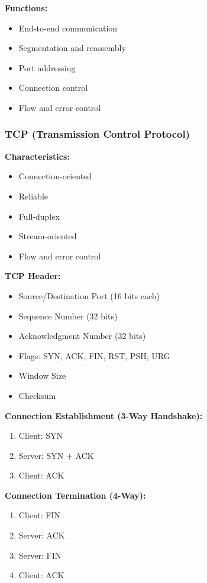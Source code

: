 \documentclass[11pt,a4paper]{article}
\begin{document}
\textbf{Functions:}
\begin{itemize}
    \item End-to-end communication
    \item Segmentation and reassembly
    \item Port addressing
    \item Connection control
    \item Flow and error control
\end{itemize}

\subsubsection{TCP (Transmission Control Protocol)}

\textbf{Characteristics:}
\begin{itemize}
    \item Connection-oriented
    \item Reliable
    \item Full-duplex
    \item Stream-oriented
    \item Flow and error control
\end{itemize}

\textbf{TCP Header:}
\begin{itemize}
    \item Source/Destination Port (16 bits each)
    \item Sequence Number (32 bits)
    \item Acknowledgment Number (32 bits)
    \item Flags: SYN, ACK, FIN, RST, PSH, URG
    \item Window Size
    \item Checksum
\end{itemize}

\textbf{Connection Establishment (3-Way Handshake):}
\begin{enumerate}
    \item Client: SYN
    \item Server: SYN + ACK
    \item Client: ACK
\end{enumerate}

\textbf{Connection Termination (4-Way):}
\begin{enumerate}
    \item Client: FIN
    \item Server: ACK
    \item Server: FIN
    \item Client: ACK
\end{enumerate}
\end{document}
